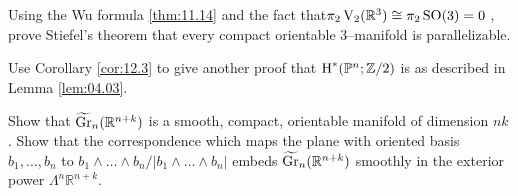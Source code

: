 \documentclass[../main]{subfiles}
\begin{document}
\begin{problem}\label{prob:12.B}
Using the Wu formula \ref{thm:11.14} and the fact that\newline $\pi_2 \operatorname{V}_2({\mathbb R}^3) \cong \pi_2 \operatorname{SO}(3) = 0$ \cite[p. 116]{steenrod1951}, prove Stiefel's theorem that every compact orientable $3$--manifold is parallelizable.
\end{problem}

\begin{problem}\label{prob:12.C}
Use Corollary \ref{cor:12.3} to give another proof that $\operatorname{H}^\ast({\mathbb P}^n; {\mathbb Z}/2)$ is as described in Lemma \ref{lem:04.03}.
\end{problem}

\begin{problem}\label{prob:12.D}
Show that ${\xtilde \grassmannian}_n({\mathbb R}^{n + k})$ is a smooth, compact, orientable manifold of dimension $nk$. Show that the correspondence which maps the plane with oriented basis $b_1, \ldots, b_n$ to $b_1 \wedge \ldots \wedge b_n/|b_1 \wedge \ldots \wedge b_n|$ embeds ${\xtilde \grassmannian}_n({\mathbb R}^{n + k})$ smoothly in the exterior power $\Lambda^n {\mathbb R}^{n + k}$. 
\end{problem}
\end{document}
